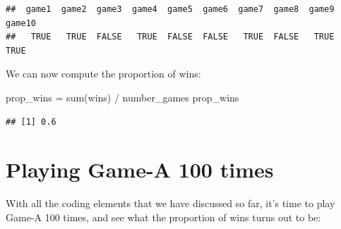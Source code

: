 \documentclass[
]{book}
\newenvironment{Shaded}{\begin{snugshade}}{\end{snugshade}}
\newcommand{\FunctionTok}[1]{\textcolor[rgb]{0.00,0.00,0.00}{#1}}
\newcommand{\NormalTok}[1]{#1}
\newcommand{\OtherTok}[1]{\textcolor[rgb]{0.56,0.35,0.01}{#1}}
\newcommand{\SpecialCharTok}[1]{\textcolor[rgb]{0.00,0.00,0.00}{#1}}
\begin{document}
\begin{verbatim}
##  game1  game2  game3  game4  game5  game6  game7  game8  game9 game10 
##   TRUE   TRUE  FALSE   TRUE  FALSE  FALSE   TRUE  FALSE   TRUE   TRUE
\end{verbatim}

We can now compute the proportion of wins:

\begin{Shaded}
\begin{Highlighting}[]
\NormalTok{prop\_wins }\OtherTok{=} \FunctionTok{sum}\NormalTok{(wins) }\SpecialCharTok{/}\NormalTok{ number\_games}
\NormalTok{prop\_wins}
\end{Highlighting}
\end{Shaded}

\begin{verbatim}
## [1] 0.6
\end{verbatim}

\hypertarget{playing-game-a-100-times}{%
\chapter{Playing Game-A 100 times}\label{playing-game-a-100-times}}

With all the coding elements that we have discussed so far, it's time to play
Game-A 100 times, and see what the proportion of wins turns out to be:
\end{document}
